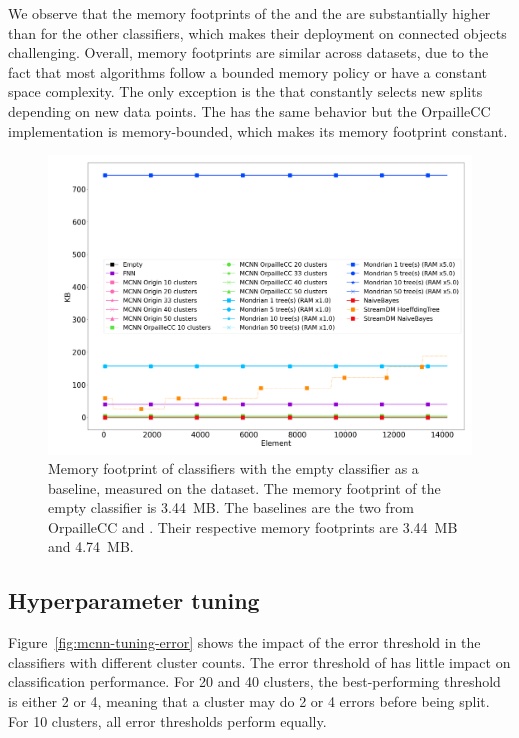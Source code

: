We observe that the memory footprints of the \mondrianforest and the
\hoeffdingtree are substantially higher than for the other classifiers, which makes 
their deployment on connected objects challenging.
Overall, memory footprints are similar across datasets, due to the
fact that most algorithms follow a bounded memory policy or have a constant
space complexity.  The only exception is the \hoeffdingtree that constantly
selects new splits depending on new data points. The \mondrianforest has the
same behavior but the OrpailleCC implementation is memory-bounded, which
makes its memory footprint constant.

\begin{figure}
		\center
	\includegraphics[width=0.8\linewidth]{figures/results/banos_6_memory.png}
	\caption{Memory footprint of classifiers with the empty
	classifier as a baseline, measured on the \banosdataset dataset. The memory footprint of the empty
	classifier is 3.44~MB. The baselines are the two \naivebayes from OrpailleCC
		and \streamdmcpp. Their respective memory footprints are 3.44~MB and
		4.74~MB.}
	\label{fig:memory}
\end{figure}


\subsection{Hyperparameter tuning}

Figure~\ref{fig:mcnn-tuning-error} shows the impact of the error threshold
in the \mcnn classifiers with different cluster counts. The error
threshold of \mcnn has little impact on classification performance. For
20 and 40 clusters, the best-performing threshold is either 2 or 4, meaning
that a cluster may do 2 or 4 errors before being split. For 10 clusters,
all error thresholds perform equally.

